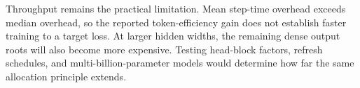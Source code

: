 Throughput remains the practical limitation. Mean step-time overhead exceeds median overhead, so the reported token-efficiency gain does not establish faster training to a target loss. At larger hidden widths, the remaining dense output roots will also become more expensive. Testing head-block factors, refresh schedules, and multi-billion-parameter models would determine how far the same allocation principle extends.
